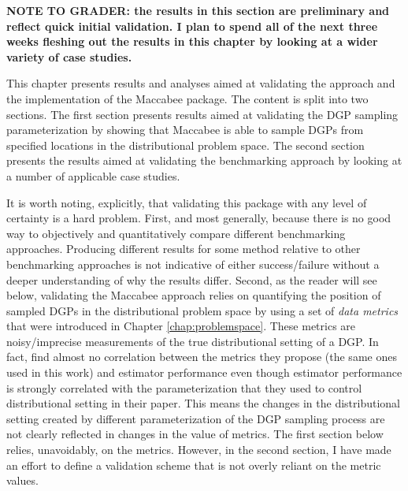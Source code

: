 \documentclass[../main.tex]{subfiles}
\begin{document}

\textbf{NOTE TO GRADER: the results in this section are preliminary and reflect quick initial validation. I plan to spend all of the next three weeks fleshing out the results in this chapter by looking at a wider variety of case studies.}

\vspace{\baselineskip}

This chapter presents results and analyses aimed at validating the approach and the implementation of the Maccabee package. The content is split into two sections. The first section presents results aimed at validating the DGP sampling parameterization by showing that Maccabee is able to sample DGPs from specified locations in the distributional problem space. The second section presents the results aimed at validating the benchmarking approach by looking at a number of applicable case studies.

\vspace{\baselineskip}

It is worth noting, explicitly, that validating this package with any level of certainty is a hard problem. First, and most generally, because there is no good way to objectively and quantitatively compare different benchmarking approaches. Producing different results for some method relative to other benchmarking approaches is not indicative of either success/failure without a deeper understanding of why the results differ. Second, as the reader will see below, validating the Maccabee approach relies on quantifying the position of sampled DGPs in the distributional problem space by using a set of \textit{data metrics} that were introduced in Chapter \ref{chap:problemspace}. These metrics are noisy/imprecise measurements of the true distributional setting of a DGP. In fact, \textcite{Dorie2019Automated1} find almost no correlation between the metrics they propose (the same ones used in this work) and estimator performance even though estimator performance is strongly correlated with the parameterization that they used to control distributional setting in their paper. This means the changes in the distributional setting created by different parameterization of the DGP sampling process are not clearly reflected in changes in the value of metrics. The first section below relies, unavoidably, on the metrics. However, in the second section, I have made an effort to define a validation scheme that is not overly reliant on the metric values.
\end{document}
